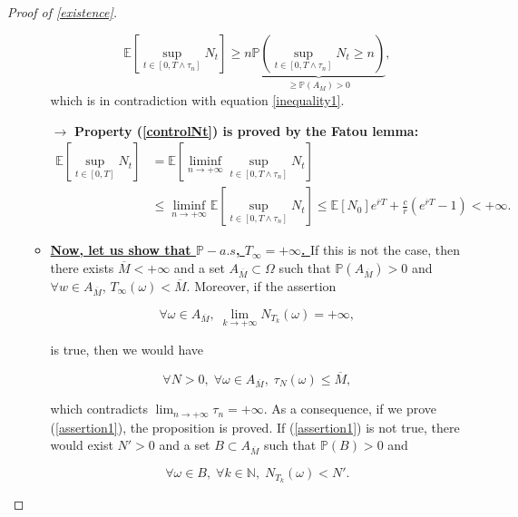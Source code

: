 \documentclass[a4paper,11pt]{article}
\newcommand{\itemb}{\item[$\bullet$]}
\newcommand{\E}{\mathbb{E}}
\begin{document}
\begin{proof}[Proof of \ref{existence}]
\begin{enumerate}
\begin{itemize}
\begin{displaymath}
\E\left[\sup_{t\in [0,T\wedge \tau_n]}N_t\right] \geq n \underbrace{\mathbb{P}\left(\sup_{t\in [0,T\wedge \tau_n]}N_t \geq n\right)}_{\geq \mathbb{P}(A_M) >0},
\end{displaymath}
which is in contradiction with equation \eqref{inequality1}. 

\item[$\rightarrow$] \textbf{Property (\ref{controlNt}) is proved by the Fatou lemma:} 
\begin{equation*}
\begin{aligned}
\E\left[ \sup_{t\in [0,T]}N_t \right] &= \E\left[\liminf_{n\rightarrow +\infty} \sup_{t\in [0,T\wedge \tau_n]}N_t \right] \\
&\leq  \liminf_{n\rightarrow +\infty} \E\left[ \sup_{t\in [0,T\wedge \tau_n]}N_t \right] \leq \mathbb{E}[N_0] e^{\overline{r}T} + \frac{c}{\overline{r}}\left( e^{\overline{r}T} -1\right) <+\infty.
\end{aligned}
\end{equation*}


\itemb \textbf{\underline{\boldmath Now, let us show that $\mathbb{P}-a.s$, $T_\infty = +\infty$. \unboldmath}} If this is not the case, then there exists $\overline{M} <+\infty$ and a set $A_{\overline{M}} \subset \Omega$ such that $\mathbb{P}(A_{\overline{M}}) >0$ and $\forall w \in A_{\overline{M}}$, $T_\infty(\omega) < \overline{M}$. Moreover, if the assertion

\begin{equation}\label{assertion1}
\forall \omega \in A_{\overline{M}},\; \lim_{k\rightarrow +\infty} N_{T_k}(\omega) = +\infty,
\end{equation}

is true, then we would have 

\begin{displaymath}
\forall N>0, \; \forall \omega \in A_{\overline{M}},\; \tau_N(\omega) \leq \overline{M},
\end{displaymath}

which contradicts $\lim_{n\rightarrow +\infty} \tau_n = +\infty$. As a consequence, if we prove (\ref{assertion1}), the proposition is proved. 
If (\ref{assertion1}) is not true, there would exist $N'>0$ and a set $B\subset A_{\overline{M}}$ such that $\mathbb{P}(B)>0$ and 

\begin{displaymath}
\forall \omega \in B, \; \forall k \in \mathbb{N},\; N_{T_k}(\omega) < N'.
\end{displaymath}


\end{itemize}
\end{enumerate}
\end{proof}
\end{document}
